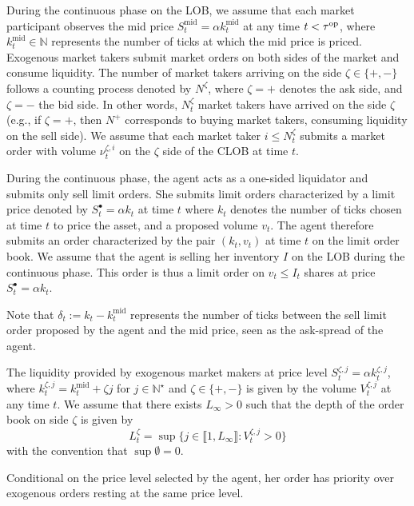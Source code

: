 \documentclass[11pt]{article}
\begin{document}
During the continuous phase on the LOB, we assume that each market participant observes the mid price $S_t^\mathrm{mid} = \alpha k_t^\mathrm{mid}$ at any time $t< \tau^{\mathrm{op}}$, where $k^\mathrm{mid}_t\in \mathbb N$ represents the number of ticks at which the mid price is priced. Exogenous market takers submit market orders on both sides of the market and consume liquidity. The number of market takers arriving on the side $\zeta\in\{+,-\}$ follows a counting process denoted by $N^\zeta$, where $\zeta = +$ denotes the ask side, and $\zeta = -$ the bid side. In other words, $N_t^\zeta$ market takers have arrived on the side $\zeta$ (e.g., if $\zeta=+$, then $N^+$ corresponds to buying market takers, consuming liquidity on the sell side). We assume that each market taker $i \leqslant N_t^\zeta$ submits a market order with volume $\nu_t^{\zeta,i}$ on the $\zeta$ side of the CLOB at time $t$.\vspace{0.5em}

During the continuous phase, the agent acts as a one-sided liquidator and submits only sell limit orders. She submits limit orders characterized by a limit price denoted by $S_t^\bullet=\alpha k_t$ at time $t$ where $k_t$ denotes the number of ticks chosen at time $t$ to price the asset, and a proposed volume $v_t$. The agent therefore submits an order characterized by the pair $(k_t,v_t)$ at time $t$ on the limit order book. We assume that the agent is selling her inventory $I$ on the LOB during the continuous phase. This order is thus a limit order on $v_{t} \leqslant I_{t}$ shares at price $S_{t}^\bullet = \alpha k_t$.
\begin{remark}
    Note that $\delta_{t} :=k_t-k_t^\mathrm{mid}$ represents the number of ticks between the sell limit order proposed by the agent and the mid price, seen as the ask-spread of the agent.
\end{remark}

The liquidity provided by exogenous market makers at price level $S_{t}^{\zeta,j} = \alpha k_{t}^{\zeta,j}$, where $k_{t}^{\zeta,j} = k_{t}^\mathrm{mid}+\zeta j$ for $j \in \mathbb{N}^\star$ and $\zeta \in \{+,-\}$ is given by the volume $V_{t}^{\zeta,j}$ at any time $t$. We assume that there exists $L_\infty>0$ such that the depth of the order book on side $\zeta$ is given by
\[L_{t}^\zeta = \sup\{j\in \llbracket 1,L_\infty\rrbracket:V_{t}^{\zeta,j} >0\}\]
with the convention that $\sup\emptyset = 0$.

\begin{assumption}
Conditional on the price level selected by the agent, her order has
priority over exogenous orders resting at the same price level.
\end{assumption}
\end{document}
